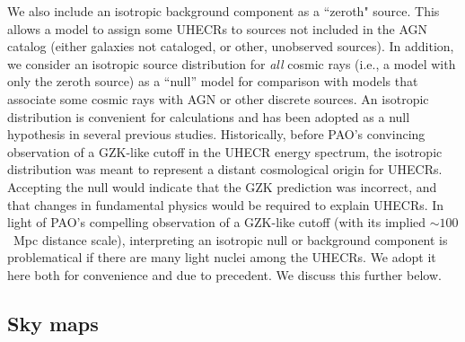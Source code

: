 We also include an isotropic background component as a ``zeroth" source.
This allows a model to assign some UHECRs to sources not included in the AGN
catalog (either galaxies not cataloged, or other, unobserved sources). In
addition, we consider an isotropic source distribution for {\em all} cosmic
rays (i.e., a model with only the zeroth source) as a ``null'' model for
comparison with models that associate some cosmic rays with AGN or other
discrete sources.  An isotropic distribution is convenient for calculations
and has been adopted as a null hypothesis in several previous studies. 
Historically, before PAO's convincing observation of a GZK-like cutoff in
the UHECR energy spectrum, the isotropic distribution was meant to represent
a distant cosmological origin for UHECRs.  Accepting the null would indicate
that the GZK prediction was incorrect, and that changes in fundamental
physics would be required to explain UHECRs.  In light of PAO's compelling
observation of a GZK-like cutoff (with its implied $\sim 100$~Mpc distance
scale), interpreting an isotropic null or background component is
problematical if there are many light nuclei among the UHECRs.  We adopt it
here both for convenience and due to precedent.  We discuss this further
below.

\subsection{Sky maps}

